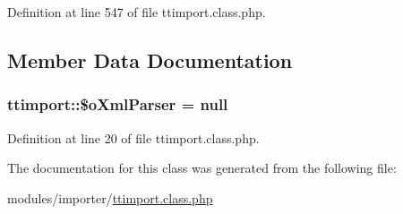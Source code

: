 Definition at line 547 of file ttimport.\+class.\+php.



\subsection{Member Data Documentation}
\hypertarget{classttimport_af3932f8dbd65a917d2d41e001bae4e87}{}
\subsubsection[{\$o\+Xml\+Parser}]{\setlength{\rightskip}{0pt plus 5cm}ttimport\+::\$o\+Xml\+Parser = null}\label{classttimport_af3932f8dbd65a917d2d41e001bae4e87}


Definition at line 20 of file ttimport.\+class.\+php.



The documentation for this class was generated from the following file\+:\begin{DoxyCompactItemize}
\item 
modules/importer/\hyperlink{ttimport_8class_8php}{ttimport.\+class.\+php}\end{DoxyCompactItemize}
